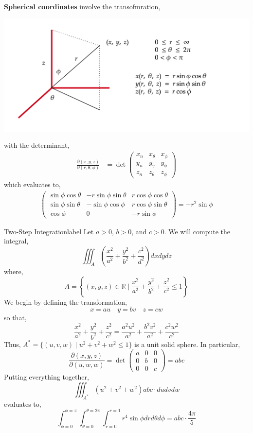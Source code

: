 \textbf{Spherical coordinates} involve the transofmration,
\begin{center}
    \includegraphics[width=0.7\linewidth]{figures/wk-6/fig-12.png}
\end{center}
with the determinant,
\begin{align*}
    \frac{\partial(x, y, z)}{\partial(r, \theta, \phi)}&=\operatorname{det}\left(\begin{array}{lll}
    x_n & x_\theta & x_{\phi} \\
    y_n & y_\gamma & y_{\phi} \\
    z_n & z_\theta & z_{\phi}
    \end{array}\right)
\end{align*}
which evaluates to,
\begin{align*}
    \left(\begin{array}{ccc}
    \sin \phi \cos \theta & -r \sin \phi \sin \theta & r \cos \phi \cos \theta \\
    \sin \phi \sin \theta & - \sin \phi \cos \phi & r \cos \phi \sin \theta \\
    \cos \phi & 0 & -r \sin \phi
    \end{array}\right)
    = -r^2 \sin \phi
\end{align*}

\begin{ex}{Two-Step Integration}{label}
    Let $a > 0$, $b > 0$, and $c > 0$. We will compute the integral,
    \[\iiint_A\left(\frac{x^2}{a^2}+\frac{y^2}{b^2}+\frac{c^2}{d^2}\right) d x d y d z\]
    where,
    \[A=\left\{(x, y, z) \in \mathbb{R} \mid \frac{x^2}{a^2}+\frac{y^2}{b^2}+\frac{z^2}{c^2} \leq 1\right\}\]
    We begin by defining the transformation,
    \[x = au \quad y = bv \quad z = cw\]
    so that,
    \[\frac{x^2}{a^2}+\frac{y^2}{b^2}+\frac{z^2}{c^2}=\frac{a^2 u^2}{a^2}+\frac{b^2 v^2}{a^2}+\frac{c^2 w^2}{c^2}\]
    Thus, $A^* = \{(u, v, w) \mid u^2 + v^2 + w^2 \leq 1\}$
    is a unit solid sphere. In particular,
    \[\frac{\partial(x, y, z)}{\partial(u, w, w)}=\operatorname{det}\left(\begin{array}{lll}
    a & 0 & 0 \\
    0 & b & 0 \\
    0 & 0 & c
    \end{array}\right)=a b c\]
    Putting everything together,
    \[\iiint_{A^*} (u^2 + v^2 + w^2) abc \cdot du dv dw\]
    evaluates to,
    \[\int_{\phi = 0}^{\phi = \pi} \int_{\theta = 0}^{\theta = 2\pi} \int_{r = 0}^{r = 1} r^4 \sin \phi dr d\theta d\phi = abc \cdot \frac{4 \pi}{5}\]
\end{ex}